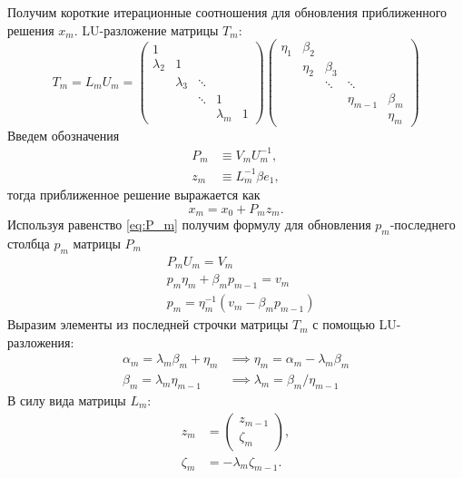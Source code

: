 \par Получим короткие итерационные соотношения для обновления приближенного решения $x_m$.
LU-разложение матрицы $T_m$:
\begin{equation*}
    T_m = L_m U_m = 
        \begin{pmatrix}
        1 & & & & \\
        \lambda_2 & 1 & & & \\
        & \lambda_3 & \ddots & & \\
        & & \ddots & 1 &  \\
        & & & \lambda_m & 1
        \end{pmatrix}
        \begin{pmatrix}
            \eta_1 & \beta_2 & & & \\
             & \eta_2 & \beta_3 & & \\
            & & \ddots & \ddots & \\
            & & & \eta_{m-1} & \beta_m \\
            & & & & \eta_m
        \end{pmatrix}
\end{equation*} 
Введем обозначения
\begin{align}
    P_m &\equiv V_m U_m^{-1}, \label{eq:P_m}\\
    z_m &\equiv L_m^{-1} \beta e_1,
\end{align}
тогда приближенное решение выражается как
\begin{equation}
    x_m = x_0 + P_m z_m.
\end{equation}
Используя равенство \eqref{eq:P_m} получим формулу для обновления $p_m$-последнего
столбца $p_m$ матрицы $P_m$
\begin{align*}
    &P_m U_m = V_m \\
    &p_m \eta_m + \beta_m p_{m-1} = v_m \\
    &p_m = \eta_m^{-1} \left( v_m - \beta_m p_{m-1} \right)
\end{align*}
Выразим элементы из последней строчки матрицы $T_m$ с помощью LU-разложения:
\begin{align*}
    \alpha_m = \lambda_m \beta_m + \eta_m &\implies \eta_m = \alpha_m - \lambda_m \beta_m \\
    \beta_m = \lambda_m \eta_{m-1} &\implies \lambda_m = \beta_m / \eta_{m-1}
\end{align*}
В силу вида матрицы $L_m$:
\begin{align*}
    z_m &= 
    \begin{pmatrix}
        z_{m-1} \\
        \zeta_m
    \end{pmatrix}, \\
    \zeta_m &= -\lambda_m \zeta_{m-1}. 
\end{align*}
